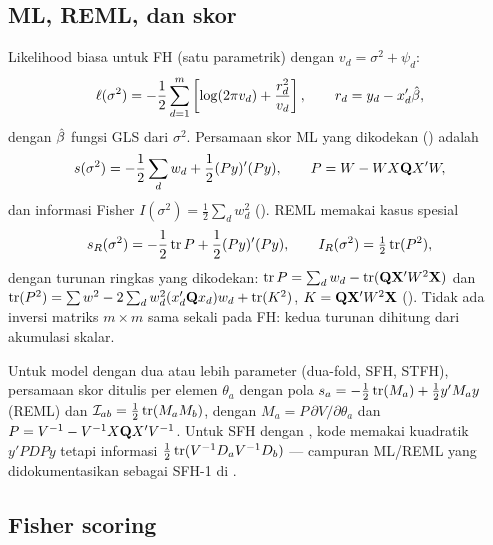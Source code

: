 \subsection{ML, REML, dan skor}\label{sec:ml-reml}

Likelihood biasa untuk FH (satu parametrik) dengan
$v_d=\sigma^2+\psi_d$:
\begin{equation}
  \ell(\sigma^2)=-\frac12\sum_{d=1}^{m}
  \left[\log(2\pi v_d)+\frac{r_d^2}{v_d}\right],
  \qquad r_d=y_d-x_d'\hat\beta,
  \label{eq:loglik-ml}
\end{equation}
dengan $\hat\beta$ fungsi GLS dari $\sigma^2$. Persamaan skor ML yang
dikodekan () adalah
\begin{equation}
  s(\sigma^2)=-\frac12\sum_d w_d+\frac12(Py)'(Py),
  \qquad P=W-WX\mathbf{Q} X'W,
  \label{eq:score-fh-ml}
\end{equation}
dan informasi Fisher $I(\sigma^2)=\frac12\sum_d w_d^2$
(). REML memakai kasus spesial
\begin{equation}
  s_R(\sigma^2)=-\frac12\operatorname{tr} P+\frac12(Py)'(Py),
  \qquad I_R(\sigma^2)=\tfrac12\operatorname{tr}(P^2),
  \label{eq:score-fh-reml}
\end{equation}
dengan turunan ringkas yang dikodekan: $\operatorname{tr} P=\sum_d w_d-\operatorname{tr}(\mathbf{Q}
\mathbf{X}'W^2\mathbf{X})$ dan $\operatorname{tr}(P^2)=\sum w^2-2\sum_d w_d^2(x_d'\mathbf{Q} x_d)w_d
+\operatorname{tr}(K^2)$, $K=\mathbf{Q}\mathbf{X}'W^2\mathbf{X}$ ().
Tidak ada inversi matriks $m\times m$ sama sekali pada FH: kedua turunan
dihitung dari akumulasi skalar.

\begin{implnote}
Untuk model dengan dua atau lebih parameter (dua-fold, SFH, STFH),
persamaan skor ditulis per elemen $\theta_a$ dengan pola
$s_a=-\tfrac12\operatorname{tr}(M_a)+\tfrac12 y'M_a y$ (REML) dan
$\mathcal I_{ab}=\tfrac12\operatorname{tr}(M_aM_b)$, dengan $M_a=P\,\partial V/\partial
\theta_a$ dan $P=V^{-1}-V^{-1}X\mathbf{Q} X'V^{-1}$. Untuk SFH dengan
, kode memakai kuadratik $y'PDPy$ tetapi informasi
$\tfrac12\operatorname{tr}(V^{-1}D_aV^{-1}D_b)$ --- campuran ML/REML yang didokumentasikan
sebagai SFH-1 di .
\end{implnote}

\subsection{Fisher scoring}\label{sec:fs}

